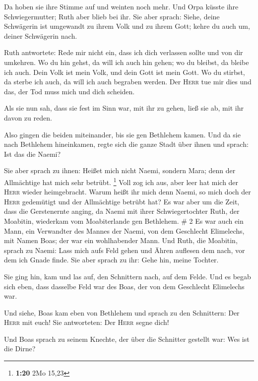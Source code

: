  Da hoben sie ihre Stimme auf und weinten noch mehr. Und
Orpa küsste ihre Schwiegermutter; Ruth aber blieb bei ihr.
 Sie aber sprach: Siehe, deine Schwägerin ist umgewandt
zu ihrem Volk und zu ihrem Gott; kehre du auch um, deiner Schwägerin
nach.

 Ruth antwortete: Rede mir nicht ein, dass ich dich
verlassen sollte und von dir umkehren. Wo du hin gehst, da will ich auch
hin gehen; wo du bleibst, da bleibe ich auch. Dein Volk ist mein Volk,
und dein Gott ist mein Gott.  Wo du stirbst, da sterbe
ich auch, da will ich auch begraben werden. Der \textsc{Herr} tue mir
dies und das, der Tod muss mich und dich scheiden.

 Als sie nun sah, dass sie fest im Sinn war, mit ihr zu
gehen, ließ sie ab, mit ihr davon zu reden.

 Also gingen die beiden miteinander, bis sie gen
Bethlehem kamen. Und da sie nach Bethlehem hineinkamen, regte sich die
ganze Stadt über ihnen und sprach: Ist das die Naemi?

 Sie aber sprach zu ihnen: Heißet mich nicht Naemi,
sondern Mara; denn der Allmächtige hat mich sehr betrübt. \footnote{\textbf{1:20}
  2Mo 15,23}  Voll zog ich aus, aber leer hat mich der
\textsc{Herr} wieder heimgebracht. Warum heißt ihr mich denn Naemi, so
mich doch der \textsc{Herr} gedemütigt und der Allmächtige betrübt hat?
 Es war aber um die Zeit, dass die Gerstenernte anging,
da Naemi mit ihrer Schwiegertochter Ruth, der Moabitin, wiederkam vom
Moabiterlande gen Bethlehem. \# 2  Es war auch ein Mann,
ein Verwandter des Mannes der Naemi, von dem Geschlecht Elimelechs, mit
Namen Boas; der war ein wohlhabender Mann.  Und Ruth, die
Moabitin, sprach zu Naemi: Lass mich aufs Feld gehen und Ähren auflesen
dem nach, vor dem ich Gnade finde. Sie aber sprach zu ihr: Gehe hin,
meine Tochter.

 Sie ging hin, kam und las auf, den Schnittern nach, auf
dem Felde. Und es begab sich eben, dass dasselbe Feld war des Boas, der
von dem Geschlecht Elimelechs war.

 Und siehe, Boas kam eben von Bethlehem und sprach zu den
Schnittern: Der \textsc{Herr} mit euch! Sie antworteten: Der
\textsc{Herr} segne dich!

 Und Boas sprach zu seinem Knechte, der über die Schnitter
gestellt war: Wes ist die Dirne?

